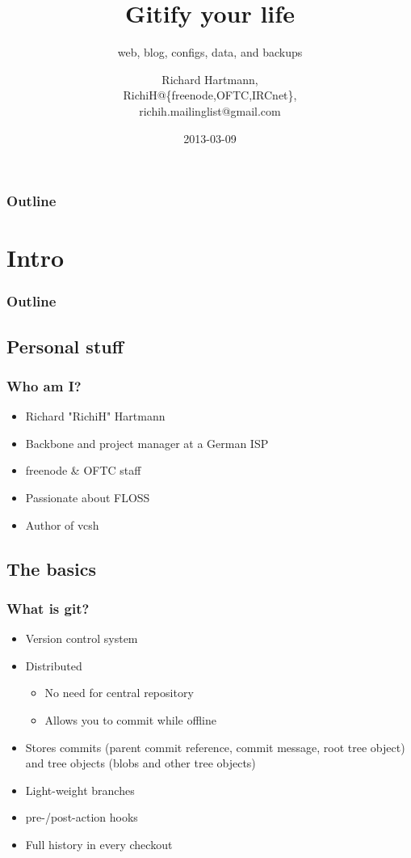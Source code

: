 \documentclass[t]{beamer}
\title{Gitify your life}
\subtitle{web, blog, configs, data, and backups}
\author{Richard Hartmann,\\
RichiH@\{freenode,OFTC,IRCnet\},\\
richih.mailinglist@gmail.com}
\date{2013-03-09}
\begin{document}
\setcounter{tocdepth}{1}

\begin{frame}
	\titlepage
\end{frame}

\begin{frame}
	\frametitle{Outline}
	\tableofcontents
\end{frame}


\section{Intro}

\begin{frame}
	\frametitle{Outline}
	\tableofcontents[currentsection]
\end{frame}

\subsection{Personal stuff}

\begin{frame}
	\frametitle{Who am I?}
	\begin{itemize}
		\item Richard "RichiH" Hartmann
		\item Backbone and project manager at a German ISP
		\item freenode \& OFTC staff
		\item Passionate about FLOSS
		\item Author of vcsh
	\end{itemize}
\end{frame}

\subsection{The basics}

\begin{frame}
	\frametitle{What is git?}
	\begin{itemize}
		\item Version control system
		\item Distributed
		\begin{itemize}
			\item No need for central repository
			\item Allows you to commit while offline
		\end{itemize}
		\item Stores commits (parent commit reference, commit message, root tree object) and tree objects (blobs and other tree objects)
		\item Light-weight branches
		\item pre-/post-action hooks
		\item Full history in every checkout
	\end{itemize}
\end{frame}
\end{document}
